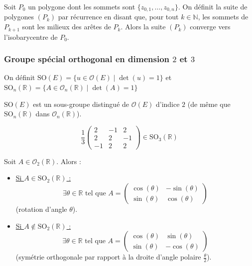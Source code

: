   \begin{application}
    Soit $P_0$ un polygone dont les sommets sont $\{ z_{0,1}, \dots, z_{0,n} \}$. On définit la suite de polygones $(P_k)$ par récurrence en disant que, pour tout $k \in \mathbb{N}$, les sommets de $P_{k+1}$ sont les milieux des arêtes de $P_k$.
    \newpar
    Alors la suite $(P_k)$ converge vers l'isobarycentre de $P_0$.
  \end{application}

  \subsubsection{Groupe spécial orthogonal en dimension \texorpdfstring{$2$}{2} et \texorpdfstring{$3$}{3}}


  \begin{definition}
    On définit $\mathrm{SO}(E) = \{ u \in \mathcal{O}(E) \mid \det(u) = 1 \}$ et $\mathrm{SO}_n(\mathbb{R}) = \{ A \in \mathcal{O}_n(\mathbb{R}) \mid \det(A) = 1 \}$
  \end{definition}


  \begin{proposition}
    $\mathrm{SO}(E)$ est un sous-groupe distingué de $\mathcal{O}(E)$ d'indice $2$ (de même que $\mathrm{SO}_n(\mathbb{R})$ dans $\mathcal{O}_n(\mathbb{R})$).
  \end{proposition}


  \begin{example}
    \[ \frac{1}{3} \begin{pmatrix} 2 & -1 & 2 \\ 2 & 2 & -1 \\ -1 & 2 & 2 \end{pmatrix} \in \mathrm{SO}_3(\mathbb{R}) \]
  \end{example}

  \begin{theorem}
    Soit $A \in \mathcal{O}_2(\mathbb{R})$. Alors :
    \begin{itemize}
      \item \uline{Si $A \in \mathrm{SO}_2(\mathbb{R})$ :}
      \[ \exists \theta \in \mathbb{R} \text{ tel que } A = \begin{pmatrix} \cos(\theta) & -\sin(\theta) \\ \sin(\theta) & \cos(\theta) \end{pmatrix} \]
      (rotation d'angle $\theta$).
      \item \uline{Si $A \notin \mathrm{SO}_2(\mathbb{R})$ :}
      \[ \exists \theta \in \mathbb{R} \text{ tel que } A = \begin{pmatrix} \cos(\theta) & \sin(\theta) \\ \sin(\theta) & -\cos(\theta) \end{pmatrix} \]
      (symétrie orthogonale par rapport à la droite d'angle polaire $\frac{\theta}{2}$).
    \end{itemize}
  \end{theorem}


